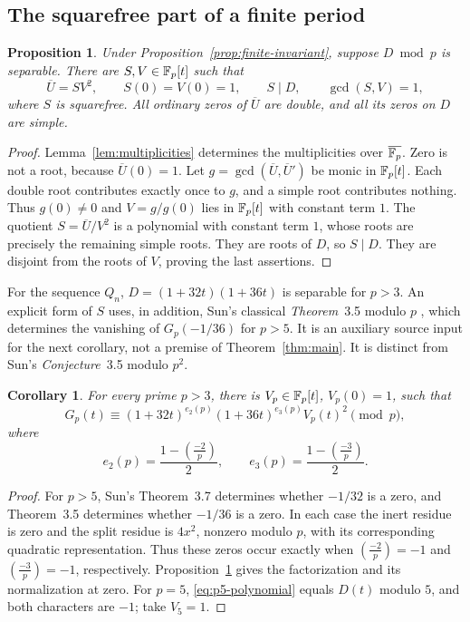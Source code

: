 \documentclass[11pt,a4paper]{article}
\newtheorem{proposition}[theorem]{Proposition}
\newtheorem{corollary}[theorem]{Corollary}
\theoremstyle{remark}
\newcommand{\leg}[2]{\left(\frac{#1}{#2}\right)}
\begin{document}
\subsection{The squarefree part of a finite period}
\begin{proposition}\label{prop:squarefree}
Under Proposition~\ref{prop:finite-invariant}, suppose $D\bmod p$
is separable. There are $S,V\in\mathbb F_p[t]$ such that
\[
 \overline U=S V^2,\qquad S(0)=V(0)=1,
 \qquad S\mid D,\qquad \gcd(S,V)=1,
\]
where $S$ is squarefree. All ordinary zeros of $\overline U$
are double, and all its zeros on $D$ are simple.
\end{proposition}
\begin{proof}
Lemma~\ref{lem:multiplicities} determines the multiplicities over
$\overline{\mathbb F_p}$. Zero is not a root, because $\overline U(0)=1$.
Let $g=\gcd(\overline U,\overline U')$ be monic in $\mathbb F_p[t]$.
Each double root contributes exactly once to $g$, and a simple
root contributes nothing. Thus $g(0)\ne0$ and
$V=g/g(0)$ lies in $\mathbb F_p[t]$ with constant term $1$.
The quotient $S=\overline U/V^2$ is a polynomial with constant
term $1$, whose roots are precisely the remaining simple roots.
They are roots of $D$, so $S\mid D$. They are disjoint from the
roots of $V$, proving the last assertions.
\end{proof}

For the sequence $Q_n$, $D=(1+32t)(1+36t)$ is separable for $p>3$.
An explicit form of $S$ uses, in addition, Sun's classical
\emph{Theorem}~3.5 modulo $p$ \cite[p.~2739]{sun}, which determines
the vanishing of $G_p(-1/36)$ for $p>5$.
It is an auxiliary source input for the next corollary, not a
premise of Theorem~\ref{thm:main}. It is distinct from Sun's
\emph{Conjecture}~3.5 modulo $p^2$.

\begin{corollary}\label{cor:explicit-squarefree}
For every prime $p>3$, there is $V_p\in\mathbb F_p[t]$, $V_p(0)=1$, such that
\begin{equation}\label{eq:explicit-squarefree}
 G_p(t)\equiv
 (1+32t)^{e_2(p)}(1+36t)^{e_3(p)}V_p(t)^2\pmod p,
\end{equation}
where
\[
 e_2(p)=\frac{1-\leg{-2}p}{2},\qquad
 e_3(p)=\frac{1-\leg{-3}p}{2}.
\]
\end{corollary}
\begin{proof}
For $p>5$, Sun's Theorem~3.7 determines whether $-1/32$ is a
zero, and Theorem~3.5 determines whether $-1/36$ is a zero.
In each case the inert residue is zero and the split residue is
$4x^2$, nonzero modulo $p$, with its corresponding quadratic
representation. Thus these zeros occur exactly when
$\leg{-2}p=-1$ and $\leg{-3}p=-1$, respectively.
Proposition~\ref{prop:squarefree} gives the factorization and its
normalization at zero. For $p=5$, \eqref{eq:p5-polynomial} equals
$D(t)$ modulo $5$, and both characters are $-1$; take $V_5=1$.
\end{proof}
\end{document}
